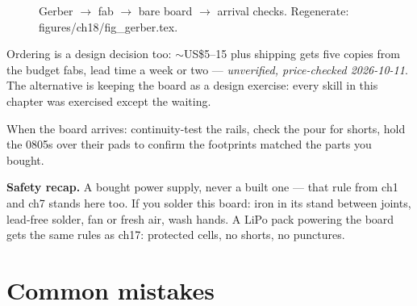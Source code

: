 \begin{figure}[htbp]
\centering

\caption{Gerber $\to$ fab $\to$ bare board $\to$ arrival checks.
Regenerate: \ttfamily figures/ch18/fig\_gerber.tex.}
\label{fig:gerber18}
\end{figure}

Ordering is a design decision too: $\sim$US\$5--15 plus shipping
gets five copies from the budget fabs, lead time a week or two ---
\emph{unverified, price-checked 2026-10-11}. The alternative is
keeping the board as a design exercise: every skill in this chapter
was exercised except the waiting.

When the board arrives: continuity-test the rails, check the pour
for shorts, hold the 0805s over their pads to confirm the footprints
matched the parts you bought.

\textbf{Safety recap.} A bought power supply, never a built one ---
that rule from ch1 and ch7 stands here too. If you solder this
board: iron in its stand between joints, lead-free solder, fan or
fresh air, wash hands. A LiPo pack powering the board gets the same
rules as ch17: protected cells, no shorts, no punctures.

\section{Common mistakes}\label{sec:cm18}

